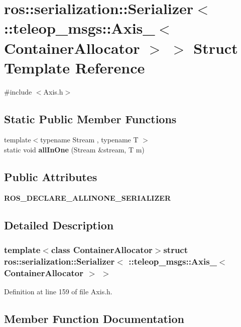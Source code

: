 \section{ros::serialization::Serializer$<$ ::teleop\_\-msgs::Axis\_\-$<$ ContainerAllocator $>$ $>$ Struct Template Reference}
\label{structros_1_1serialization_1_1Serializer_3_01_1_1teleop__msgs_1_1Axis___3_01ContainerAllocator_01_4_01_4}


{\ttfamily \#include $<$Axis.h$>$}

\subsection*{Static Public Member Functions}
\begin{DoxyCompactItemize}
\item 
{\footnotesize template$<$typename Stream , typename T $>$ }\\static void {\bf allInOne} (Stream \&stream, T m)
\end{DoxyCompactItemize}
\subsection*{Public Attributes}
\begin{DoxyCompactItemize}
\item 
{\bf ROS\_\-DECLARE\_\-ALLINONE\_\-SERIALIZER}
\end{DoxyCompactItemize}


\subsection{Detailed Description}
\subsubsection*{template$<$class ContainerAllocator$>$struct ros::serialization::Serializer$<$ ::teleop\_\-msgs::Axis\_\-$<$ ContainerAllocator $>$ $>$}



Definition at line 159 of file Axis.h.



\subsection{Member Function Documentation}
